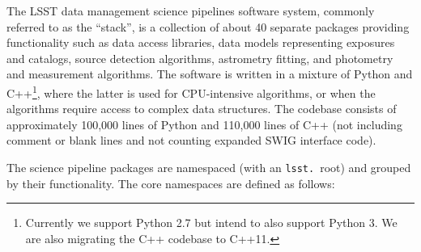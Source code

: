 \documentclass[11pt,twoside]{article}
\begin{document}
The LSST data management science pipelines software system, commonly
referred to as the ``stack'', is a collection of about 40 separate
packages providing functionality such as data access libraries, data
models representing exposures and catalogs, source detection
algorithms, astrometry fitting, and photometry and measurement
algorithms. The software is written in a mixture of Python and
C++\footnote{Currently we support Python 2.7 but intend to also
  support Python 3. We are also migrating the C++ codebase to C++11.},
where the latter is used for CPU-intensive algorithms, or when the
algorithms require access to complex data structures. The codebase
consists of approximately 100,000 lines of Python and 110,000 lines of
C++ (not including comment or blank lines and not counting expanded
SWIG \citep[see e.g.][]{beazley2003automated} interface code).

The science pipeline packages are namespaced (with an \texttt{lsst.}\
root) and grouped by their functionality. The core namespaces are
defined as follows:
\end{document}
